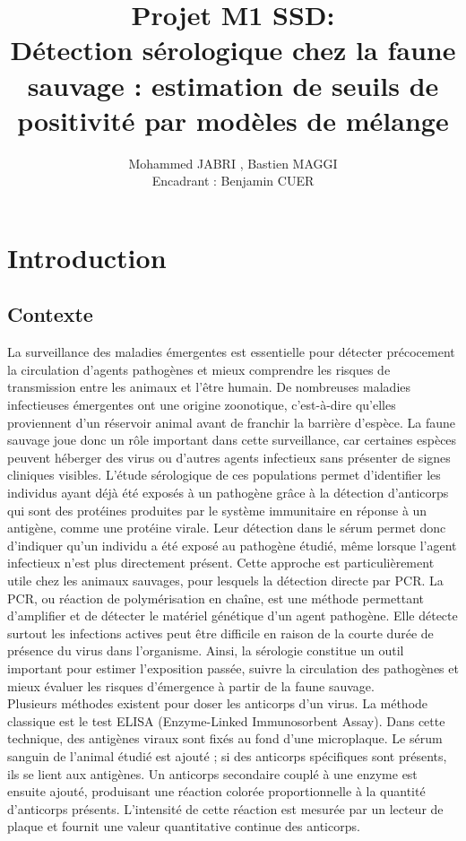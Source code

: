 \documentclass[a4paper]{article}
\author{Mohammed JABRI , Bastien MAGGI \\
Encadrant : Benjamin CUER}
\date{}
\title{Projet M1 SSD:\\
Détection sérologique chez la faune sauvage : estimation de seuils de
positivité par modèles de mélange}
\begin{document}
\maketitle
\tableofcontents
\newpage

\section{Introduction}

\subsection{Contexte}

La surveillance des maladies émergentes est essentielle pour détecter précocement la circulation d’agents pathogènes et mieux comprendre les risques de transmission entre les animaux et l’être humain. De nombreuses maladies infectieuses émergentes ont une origine zoonotique, c’est-à-dire qu’elles proviennent d’un réservoir animal avant de franchir la barrière d’espèce. La faune sauvage joue donc un rôle important dans cette surveillance, car certaines espèces peuvent héberger des virus ou d’autres agents infectieux sans présenter de signes cliniques visibles. L’étude sérologique de ces populations permet d’identifier les individus ayant déjà été exposés à un pathogène grâce à la détection d’anticorps qui sont des protéines produites par le système immunitaire en réponse à un antigène, comme une protéine virale. Leur détection dans le sérum permet donc d’indiquer qu’un individu a été exposé au pathogène étudié, même lorsque l’agent infectieux n’est plus directement présent. Cette approche est particulièrement utile chez les animaux sauvages, pour lesquels la détection directe par PCR. La PCR, ou réaction de polymérisation en chaîne, est une méthode permettant d’amplifier et de détecter le matériel génétique d’un agent pathogène. Elle détecte surtout les infections actives peut être difficile en raison de la courte durée de présence du virus dans l’organisme. Ainsi, la sérologie constitue un outil important pour estimer l’exposition passée, suivre la circulation des pathogènes et mieux évaluer les risques d’émergence à partir de la faune sauvage. \\

Plusieurs méthodes existent pour doser les anticorps d'un virus. La méthode classique est le test ELISA (Enzyme-Linked Immunosorbent Assay). Dans cette technique, des antigènes viraux sont fixés au fond d’une microplaque. Le sérum sanguin de l’animal étudié est ajouté ; si des anticorps spécifiques sont présents, ils se lient aux antigènes. Un anticorps secondaire couplé à une enzyme est ensuite ajouté, produisant une réaction colorée proportionnelle à la quantité d’anticorps présents. L’intensité de cette réaction est mesurée par un lecteur de plaque et fournit une valeur quantitative continue des anticorps. \\
\end{document}
